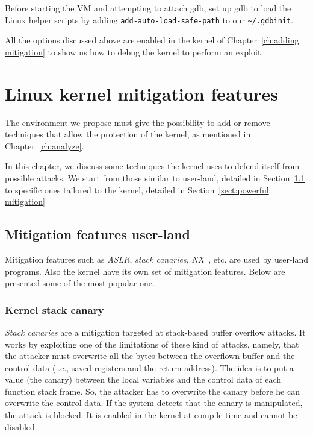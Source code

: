 \documentclass{masterthesis}
\newcommand{\vtnote}[1]{\todo[color=green!20]{#1}}
\newcommand{\refToChapter}[1]{Chapter~\ref{ch:#1}\xspace}
\newcommand{\refToSection}[1]{Section~\ref{sect:#1}\xspace}
\begin{document}
Before starting the VM and attempting to attach gdb, set up gdb to load the Linux helper scripts by adding \lstinline[language={}]{add-auto-load-safe-path} to our \lstinline{~/.gdbinit}.

All the options discussed above are enabled in the kernel of \refToChapter{adding mitigation} to show us how to debug the kernel to perform an exploit.

\chapter{Linux kernel mitigation features}
\label{ch:mitigation}
The environment we propose must give the possibility to add or remove techniques that allow the protection of the kernel, as mentioned in \refToChapter{analyze}.\vtnote{aggiunto}

In this chapter, we discuss some techniques the kernel uses to defend itself from possible attacks.
We start from those similar to user-land, detailed in \refToSection{like user-land} to specific ones tailored to the kernel, detailed in \refToSection{powerful mitigation}
\section{Mitigation features user-land}
\label{sect:like user-land}
Mitigation features such as \emph{ASLR}, \emph{stack canaries}, \emph{NX}~\cite{salwan2014introduction}, etc. are used by user-land programs. Also the kernel have its own set of mitigation features. Below are presented some of the most popular one.

\subsection{Kernel stack canary}
\label{subsect:canary}
\emph{Stack canaries} are a mitigation targeted at stack-based buffer overflow attacks. It works by exploiting one of the limitations of these kind of attacks, namely, that the attacker must overwrite all the bytes between the overflown buffer and the control data (i.e., saved registers and the return address). The idea is to put a value (the canary) between the local variables and the control data of each function stack frame. So, the attacker has to overwrite the canary before he can overwrite the control data. If the system detects that the canary is manipulated, the attack is blocked.
It is enabled in the kernel at compile time and cannot be disabled.
\end{document}
